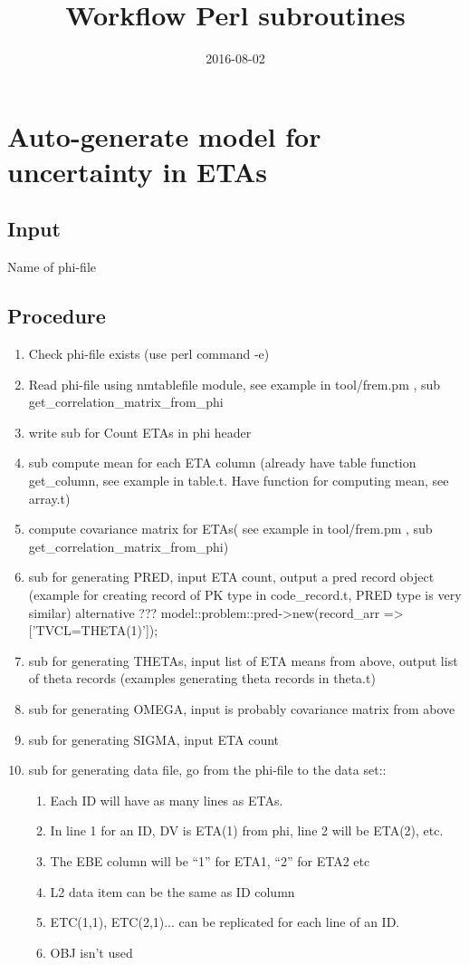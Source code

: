 \documentclass{article}
\title{Workflow Perl subroutines}
\date{2016-08-02}
\begin{document}
\maketitle

\section*{Auto-generate model for uncertainty in ETAs}
\subsection*{Input} Name of phi-file
\subsection*{Procedure}
\begin{enumerate}
\item Check phi-file exists (use perl command -e)
\item Read phi-file using nmtablefile module, see example in tool/frem.pm , sub get\_correlation\_matrix\_from\_phi
\item write sub for Count ETAs in phi header 
  \item sub compute mean for each ETA column (already have table function get\_column, see example in table.t. Have function for computing mean, see array.t)
  \item compute covariance matrix for ETAs( see example in tool/frem.pm , sub get\_correlation\_matrix\_from\_phi)
  \item sub for generating PRED, input ETA count, output a pred record object (example for creating record of PK type in code\_record.t, PRED type is very similar)
    alternative ??? model::problem::pred->new(record\_arr => ['TVCL=THETA(1)']);
  \item sub for generating THETAs, input list of ETA means from above, output list of theta records (examples generating theta records in theta.t)
  \item sub for generating OMEGA, input is probably covariance matrix from above
  \item sub for generating SIGMA, input ETA count
  \item sub for generating data file, go from the phi-file to the data set::
    \begin{enumerate}
      \item Each ID will have as many lines as ETAs.
       \item In line 1 for an ID, DV is ETA(1) from phi, line 2 will be ETA(2), etc.
         \item  The EBE column will be “1” for ETA1, “2” for ETA2 etc
           \item L2 data item can be the same as ID column
            \item      ETC(1,1),  ETC(2,1)... can be replicated for each line of an ID.
              \item    OBJ isn’t used
      \end{enumerate}
\end{enumerate}
\end{document}
